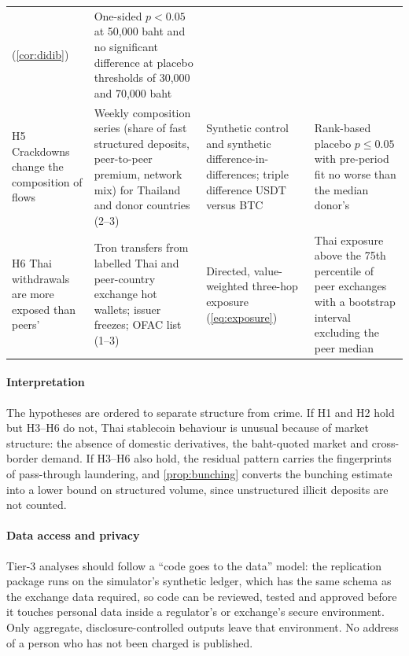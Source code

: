 \begin{table}[!htbp]
\begin{tabularx}{\textwidth}{L{2.5cm}L{4.35cm}L{4.1cm}X}
(\cref{cor:didib}) & One-sided $p<0.05$ at 50,000 baht and no significant difference at placebo thresholds of 30,000 and
70,000 baht \\
\addlinespace
H5 Crackdowns change the composition of flows & Weekly composition series (share of fast structured deposits,
peer-to-peer premium, network mix) for Thailand and donor countries (2--3) & Synthetic control and synthetic
difference-in-differences; triple difference USDT versus BTC & Rank-based placebo $p\le0.05$ with pre-period fit no
worse than the median donor's \\
\addlinespace
H6 Thai withdrawals are more exposed than peers' & Tron transfers from labelled Thai and peer-country exchange hot
wallets; issuer freezes; OFAC list (1--3) & Directed, value-weighted three-hop exposure (\cref{eq:exposure}) & Thai
exposure above the 75th percentile of peer exchanges with a bootstrap interval excluding the peer median \\
\bottomrule
\end{tabularx}
\par{}
\end{table}

\paragraph{Interpretation}
The hypotheses are ordered to separate structure from crime. If H1 and H2 hold but H3--H6 do not, Thai stablecoin
behaviour is unusual because of market structure: the absence of domestic derivatives, the baht-quoted market and
cross-border demand. If H3--H6 also hold, the residual pattern carries the fingerprints of pass-through laundering,
and \cref{prop:bunching} converts the bunching estimate into a lower bound on structured volume, since unstructured
illicit deposits are not counted.

\paragraph{Data access and privacy}
Tier-3 analyses should follow a ``code goes to the data'' model: the replication package runs on the simulator's
synthetic ledger, which has the same schema as the exchange data required, so code can be reviewed, tested and
approved before it touches personal data inside a regulator's or exchange's secure environment. Only aggregate,
disclosure-controlled outputs leave that environment. No address of a person who has not been charged is published.

